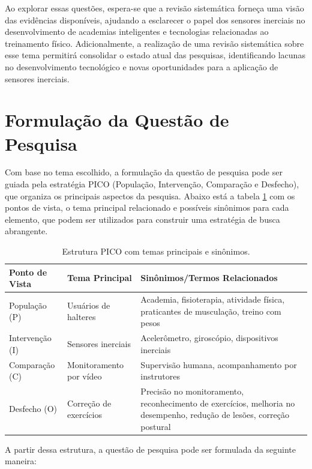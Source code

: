 \documentclass[a4paper,12pt]{article}
\begin{document}
Ao explorar essas questões, espera-se que a revisão sistemática forneça uma visão das evidências disponíveis, ajudando a esclarecer o papel dos sensores inerciais no desenvolvimento de academias inteligentes e tecnologias relacionadas ao treinamento físico. Adicionalmente, a realização de uma revisão sistemática sobre esse tema permitirá consolidar o estado atual das pesquisas, identificando lacunas no desenvolvimento tecnológico e novas oportunidades para a aplicação de sensores inerciais.

\section{Formulação da Questão de Pesquisa}

Com base no tema escolhido, a formulação da questão de pesquisa pode ser guiada pela estratégia PICO (População, Intervenção, Comparação e Desfecho), que organiza os principais aspectos da pesquisa. Abaixo está a tabela \ref{tab:PICO} com os pontos de vista, o tema principal relacionado e possíveis sinônimos para cada elemento, que podem ser utilizados para construir uma estratégia de busca abrangente.

\begin{table}[ht]
\centering
\begin{tabular}{|p{3cm}|p{4cm}|p{7cm}|}
\hline
\textbf{Ponto de Vista} & \textbf{Tema Principal} & \textbf{Sinônimos/Termos Relacionados} \\ \hline
População (P)           & Usuários de halteres    & Academia, fisioterapia, atividade física, praticantes de musculação, treino com pesos \\ \hline
Intervenção (I)         & Sensores inerciais      & Acelerômetro, giroscópio, dispositivos inerciais \\ \hline
Comparação (C)          & Monitoramento por vídeo    & Supervisão humana, acompanhamento por instrutores \\ \hline
Desfecho (O)            & Correção de exercícios  & Precisão no monitoramento, reconhecimento de exercícios, melhoria no desempenho, redução de lesões, correção postural \\ \hline
\end{tabular}
\caption{Estrutura PICO com temas principais e sinônimos.}
\label{tab:PICO}
\end{table}
\newpage

A partir dessa estrutura, a questão de pesquisa pode ser formulada da seguinte maneira:
\end{document}
